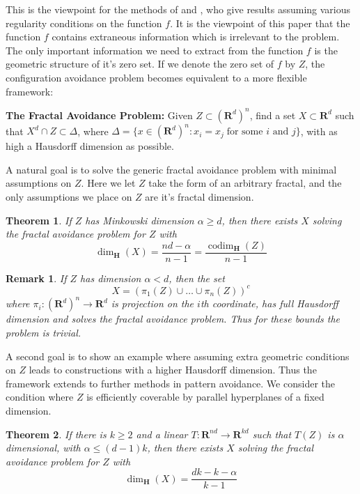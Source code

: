 \documentclass{article}
\theoremstyle{plain}
\theoremstyle{plain}
\newtheorem{theorem}{Theorem}
\newtheorem*{remark}{Remark}
\DeclareMathOperator{\codim}{codim}
\begin{document}
\begin{multicols}{2}
This is the viewpoint for the methods of \cite{MalabikaRob} and \cite{Mathe}, who give results assuming various regularity conditions on the function $f$. It is the viewpoint of this paper that the function $f$ contains extraneous information which is irrelevant to the problem. The only important information we need to extract from the function $f$ is the geometric structure of it's zero set. If we denote the zero set of $f$ by $Z$, the configuration avoidance problem becomes equivalent to a more flexible framework:

\begin{changemargin}{0.5em}{0em}
	{\bf The Fractal Avoidance Problem:} Given $Z \subset (\mathbf{R}^d)^n$, find a set $X \subset \mathbf{R}^d$ such that $X^d \cap Z \subset \Delta$, where $\Delta = \{ x \in (\mathbf{R}^d)^n : x_i = x_j\; \text{for some $i$ and $j$} \}$, with as high a Hausdorff dimension as possible.
\end{changemargin}

A natural goal is to solve the generic fractal avoidance problem with minimal assumptions on $Z$. Here we let $Z$ take the form of an arbitrary fractal, and the only assumptions we place on $Z$ are it's fractal dimension.

\begin{theorem}
	If $Z$ has Minkowski dimension $\alpha \geq d$, then there exists $X$ solving the fractal avoidance problem for $Z$ with
	\[ \dim_{\mathbf{H}}(X) = \frac{nd - \alpha}{n - 1} = \frac{\codim_{\mathbf{H}}(Z)}{n - 1} \]
\end{theorem}

\begin{remark}
	If $Z$ has dimension $\alpha < d$, then the set
	\[ X = (\pi_1(Z) \cup \dots \cup \pi_n(Z))^c \]
	where $\pi_i: (\mathbf{R}^d)^n \to \mathbf{R}^d$ is projection on the $i$th coordinate, has full Hausdorff dimension and solves the fractal avoidance problem. Thus for these bounds the problem is trivial.
\end{remark}


A second goal is to show an example where assuming extra geometric conditions on $Z$ leads to constructions with a higher Hausdorff dimension. Thus the framework extends to further methods in pattern avoidance. We consider the condition where $Z$ is efficiently coverable by parallel hyperplanes of a fixed dimension.

\begin{theorem}
	If there is $k \geq 2$ and a linear $T: \mathbf{R}^{nd} \to \mathbf{R}^{kd}$ such that $T(Z)$ is $\alpha$ dimensional, with $\alpha \leq (d-1)k$, then there exists $X$ solving the fractal avoidance problem for $Z$ with
	\[ \dim_{\mathbf{H}}(X) = \frac{dk - k - \alpha}{k-1} \]
\end{theorem}


\end{multicols}
\end{document}
